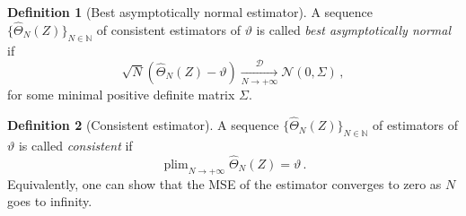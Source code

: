 \documentclass[final]{aomart}
\newtheorem[{}\it]{thm}{Theorem}[section]
\theoremstyle{definition}
\newtheorem{defn}{Definition}[section]
\newtheorem*[{}\it]{notation}{Notation}
\numberwithin{equation}{section}
\newcommand{\wh}{\widehat}
\renewcommand{\theta}{\vartheta}
\newcommand{\hTheta}{\wh{\Theta}} %
\DeclareMathOperator*{\plim}{plim}
\begin{document}
\begin{defn}[Best asymptotically normal estimator]
	\label{def_normal}
	A sequence \(\{\hTheta_N(Z)\}_{N \in \mathbb{N}}\) of consistent estimators of \(\theta\) is called \emph{best asymptotically normal} if
	\begin{equation}
	\sqrt{N} \left(\hTheta_N(Z) - \theta\right) \xrightarrow[N \to +\infty]{\mathcal{D}} \mathcal{N}(0, \Sigma)\,,
	\end{equation}
	for some minimal positive definite matrix \(\Sigma\).
\end{defn}

\begin{defn}[Consistent estimator]
	\label{def_consis}
	A sequence \(\{\hTheta_N(Z)\}_{N \in \mathbb{N}}\) of estimators of \(\theta\) is called \emph{consistent} if
	\begin{equation}
	\plim_{N \to +\infty} \hTheta_N(Z) = \theta\,.
	\end{equation}
	Equivalently, one can show that the MSE of the estimator converges to zero as \(N\) goes to infinity.
\end{defn}
\end{document}
